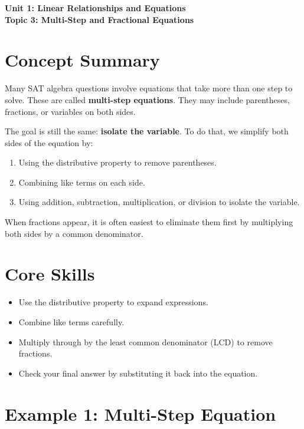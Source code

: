 \documentclass[14pt]{extarticle}
\begin{document}
\raggedright
{}

\begin{center}
    \LARGE \textbf{Unit 1: Linear Relationships and Equations} \\[6pt]
    \Large \textbf{Topic 3: Multi-Step and Fractional Equations}
\end{center}

\vspace{1em}

\section*{Concept Summary}

Many SAT algebra questions involve equations that take more than one step to solve.  
These are called \textbf{multi-step equations}. They may include parentheses, fractions, or variables on both sides.  

The goal is still the same: \textbf{isolate the variable}.  
To do that, we simplify both sides of the equation by:
\begin{enumerate}
    \item Using the distributive property to remove parentheses.  
    \item Combining like terms on each side.  
    \item Using addition, subtraction, multiplication, or division to isolate the variable.
\end{enumerate}

When fractions appear, it is often easiest to eliminate them first by multiplying both sides by a common denominator.

\section*{Core Skills}
\begin{itemize}
    \item Use the distributive property to expand expressions.  
    \item Combine like terms carefully.  
    \item Multiply through by the least common denominator (LCD) to remove fractions.  
    \item Check your final answer by substituting it back into the equation.
\end{itemize}

\section*{Example 1: Multi-Step Equation}
\end{document}
